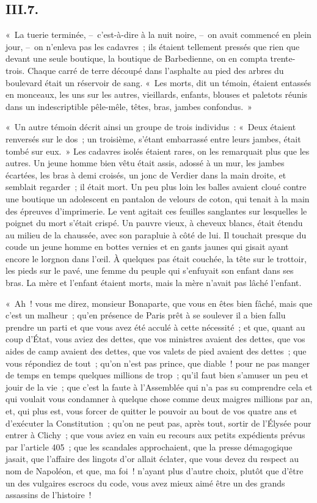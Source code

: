 \documentclass[french,twoside]{book} %
\begin{document}
\subsection[{III.7.}]{III.7.}
\noindent « La tuerie terminée, – c’est-à-dire à la nuit noire, – on avait commencé en plein jour, – on n’enleva pas les cadavres ; ils étaient tellement pressés que rien que devant une seule boutique, la boutique de Barbedienne, on en compta trente-trois. Chaque carré de terre découpé dans l’asphalte au pied des arbres du boulevard était un réservoir de sang. « Les morts, dit un témoin, étaient entassés en monceaux, les uns sur les autres, vieillards, enfants, blouses et paletots réunis dans un indescriptible pêle-mêle, têtes, bras, jambes confondus. »\par
« Un autre témoin décrit ainsi un groupe de trois individus : « Deux étaient renversés sur le dos ; un troisième, s’étant embarrassé entre leurs jambes, était tombé sur eux. » Les cadavres isolés étaient rares, on les remarquait plus que les autres. Un jeune homme bien vêtu était assis, adossé à un mur, les jambes écartées, les bras à demi croisés, un jonc de Verdier dans la main droite, et semblait regarder ; il était mort. Un peu plus loin les balles avaient cloué contre une boutique un adolescent en pantalon de velours de coton, qui tenait à la main des épreuves d’imprimerie. Le vent agitait ces feuilles sanglantes sur lesquelles le poignet du mort s’était crispé. Un pauvre vieux, à cheveux blancs, était étendu au milieu de la chaussée, avec son parapluie à côté de lui. Il touchait presque du coude un jeune homme en bottes vernies et en gants jaunes qui gisait ayant encore le lorgnon dans l’œil. À quelques pas était couchée, la tête sur le trottoir, les pieds sur le pavé, une femme du peuple qui s’enfuyait son enfant dans ses bras. La mère et l’enfant étaient morts, mais la mère n’avait pas lâché l’enfant.\par
« Ah ! vous me direz, monsieur Bonaparte, que vous en êtes bien fâché, mais que c’est un malheur ; qu’en présence de Paris prêt à se soulever il a bien fallu prendre un parti et que vous avez été acculé à cette nécessité ; et que, quant au coup d’État, vous aviez des dettes, que vos ministres avaient des dettes, que vos aides de camp avaient des dettes, que vos valets de pied avaient des dettes ; que vous répondiez de tout ; qu’on n’est pas prince, que diable ! pour ne pas manger de temps en temps quelques millions de trop ; qu’il faut bien s’amuser un peu et jouir de la vie ; que c’est la faute à l’Assemblée qui n’a pas su comprendre cela et qui voulait vous condamner à quelque chose comme deux maigres millions par an, et, qui plus est, vous forcer de quitter le pouvoir au bout de vos quatre ans et d’exécuter la Constitution ; qu’on ne peut pas, après tout, sortir de l’Élysée pour entrer à Clichy ; que vous aviez en vain eu recours aux petits expédients prévus par l’article 405 ; que les scandales approchaient, que la presse démagogique jasait, que l’affaire des lingots d’or allait éclater, que vous devez du respect au nom de Napoléon, et que, ma foi ! n’ayant plus d’autre choix, plutôt que d’être un des vulgaires escrocs du code, vous avez mieux aimé être un des grands assassins de l’histoire !\par
\end{document}
